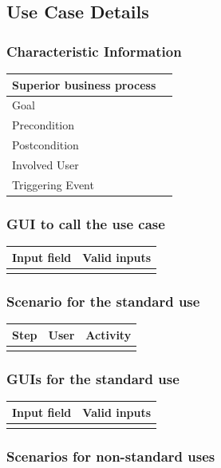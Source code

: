 \documentclass[12pt]{article}
\theoremstyle{definition}
\begin{document}
\subsection{Use Case Details}

\subsubsection{Characteristic Information}

\begin{tabular}{|l|l|}
\hline
Superior business process &  \\ \hline
Goal &  \\ \hline
Precondition &  \\ \hline
Postcondition &  \\ \hline
Involved User &  \\ \hline
Triggering Event &  \\ \hline
\end{tabular}

\subsubsection{GUI to call the use case}

\begin{tabular}{|l|l|}
\hline
Input field & Valid inputs \\ \hline
 &  \\ \hline
\end{tabular}

\subsubsection{Scenario for the standard use}

\begin{tabular}{|l|l|l|}
\hline
Step & User & Activity \\ \hline
 & & \\ \hline
\end{tabular}

\subsubsection{GUIs for the standard use}
\begin{tabular}{|l|l|}
\hline
Input field & Valid inputs \\ \hline
 &  \\ \hline
\end{tabular}
\subsubsection{Scenarios for non-standard uses}
\end{document}
